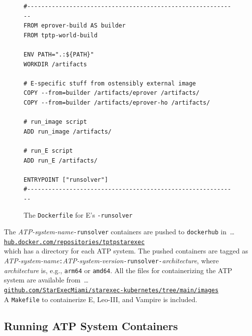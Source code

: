 \documentclass{easychair}
\begin{document}
\begin{figure}[htb]
{\small
\begin{verbatim}
#------------------------------------------------------------
FROM eprover-build AS builder
FROM tptp-world-build

ENV PATH=".:${PATH}"
WORKDIR /artifacts

# E-specific stuff from ostensibly external image
COPY --from=builder /artifacts/eprover /artifacts/
COPY --from=builder /artifacts/eprover-ho /artifacts/

# run_image script 
ADD run_image /artifacts/

# run_E script 
ADD run_E /artifacts/

ENTRYPOINT ["runsolver"]
#------------------------------------------------------------
\end{verbatim}
}
\caption{The {\tt Dockerfile} for E's {\tt -runsolver}}
\label{E---runsolver}
\end{figure}

The {\em ATP-system-name}{\tt -runsolver} containers are pushed to {\tt dockerhub} in~\ldots\\
\hspace*{1cm}\href{https://hub.docker.com/repositories/tptpstarexec}{\tt hub.docker.com/repositories/tptpstarexec}\\
which has a directory for each ATP system.
The pushed containers are tagged as 
{\em ATP-system-name}{\tt :}{\em ATP-system-version}{\tt -runsolver-}{\em architecture},
where {\em architecture} is, e.g., {\tt arm64} or {\tt amd64}.
All the files for containerizing the ATP system are available from~\ldots \\
\hspace*{1cm}\href{https://github.com/StarExecMiami/starexec-kubernetes/tree/main/images}{\tt github.com/StarExecMiami/starexec-kubernetes/tree/main/images}\\
A {\tt Makefile} to containerize E, Leo-III, and Vampire is included.

\subsection{Running ATP System Containers}
\label{Running}
\end{document}
